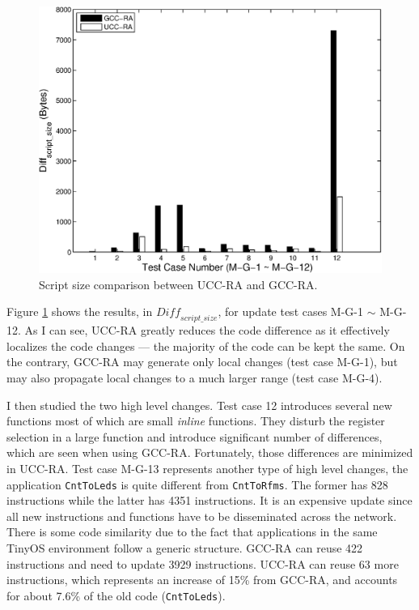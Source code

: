\vspace{0.2in}
\begin{figure}[htbp]
\centering
\includegraphics[scale=0.6]{figures/upd.eps}
\caption{Script size comparison between UCC-RA and GCC-RA.}
\label{fexp.upd}
\end{figure}

Figure \ref{fexp.upd} shows the results, in $\textit{Diff}_{script\_size}$, for update
test cases M-G-1 $\sim$ M-G-12.  As I can see, UCC-RA greatly reduces the code
difference as it effectively localizes the code changes --- the
majority of the code can be kept the same.  On the contrary, GCC-RA
may generate only local changes (test case M-G-1), but may also propagate local
changes to a much larger range (test case M-G-4).

I then studied the two high level changes. Test case 12 introduces
several new functions most of which are small {\em inline}
functions. They disturb the register selection in a large function and
introduce significant number of differences, which are seen when using
GCC-RA. Fortunately, those differences are minimized in UCC-RA.
Test case M-G-13 represents another type of high level
changes, the application {\tt CntToLeds} is quite different from
{\tt CntToRfms}.  The former has 828 instructions while the latter has
4351 instructions. It is an expensive update since all new instructions
and functions have to be disseminated across the network. There is
some code similarity due to the fact that applications in the same
TinyOS environment follow a generic structure.  GCC-RA can reuse 422
instructions and need to update 3929 instructions. UCC-RA can reuse 63
more instructions, which represents an increase of 15\% from GCC-RA,
and accounts for about 7.6\% of the old code ({\tt CntToLeds}).

